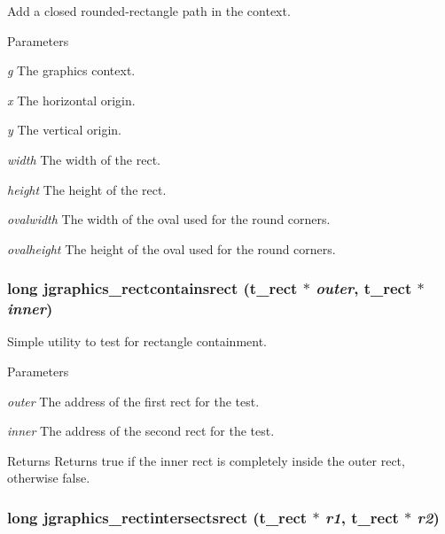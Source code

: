 Add a closed rounded-\/rectangle path in the context. 
\begin{DoxyParams}{Parameters}
\item[{\em g}]The graphics context. \item[{\em x}]The horizontal origin. \item[{\em y}]The vertical origin. \item[{\em width}]The width of the rect. \item[{\em height}]The height of the rect. \item[{\em ovalwidth}]The width of the oval used for the round corners. \item[{\em ovalheight}]The height of the oval used for the round corners. \end{DoxyParams}
\hypertarget{group__jgraphics_gaabca7cb7d45c92e788456a2d7dbfd4f6}{
\subsubsection[{jgraphics\_\-rectcontainsrect}]{\setlength{\rightskip}{0pt plus 5cm}long jgraphics\_\-rectcontainsrect ({\bf t\_\-rect} $\ast$ {\em outer}, \/  {\bf t\_\-rect} $\ast$ {\em inner})}}
\label{group__jgraphics_gaabca7cb7d45c92e788456a2d7dbfd4f6}


Simple utility to test for rectangle containment. 
\begin{DoxyParams}{Parameters}
\item[{\em outer}]The address of the first rect for the test. \item[{\em inner}]The address of the second rect for the test. \end{DoxyParams}
\begin{DoxyReturn}{Returns}
Returns true if the inner rect is completely inside the outer rect, otherwise false. 
\end{DoxyReturn}
\hypertarget{group__jgraphics_gaa8e30eaa2c74766b0c7ef3977fd8a06c}{
\subsubsection[{jgraphics\_\-rectintersectsrect}]{\setlength{\rightskip}{0pt plus 5cm}long jgraphics\_\-rectintersectsrect ({\bf t\_\-rect} $\ast$ {\em r1}, \/  {\bf t\_\-rect} $\ast$ {\em r2})}}
\label{group__jgraphics_gaa8e30eaa2c74766b0c7ef3977fd8a06c}


